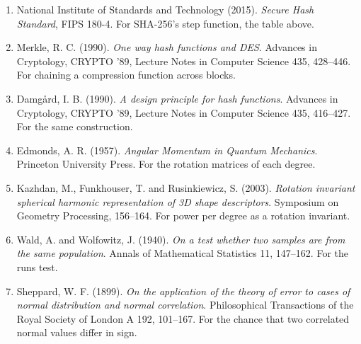\begin{enumerate}
  \item National Institute of Standards and Technology (2015). \emph{Secure Hash Standard}, FIPS 180-4. For SHA-256's step function, the table above.
  \item Merkle, R. C. (1990). \emph{One way hash functions and DES}. Advances in Cryptology, CRYPTO '89, Lecture Notes in Computer Science 435, 428--446. For chaining a compression function across blocks.
  \item Damg\aa{}rd, I. B. (1990). \emph{A design principle for hash functions}. Advances in Cryptology, CRYPTO '89, Lecture Notes in Computer Science 435, 416--427. For the same construction.
  \item Edmonds, A. R. (1957). \emph{Angular Momentum in Quantum Mechanics}. Princeton University Press. For the rotation matrices of each degree.
  \item Kazhdan, M., Funkhouser, T. and Rusinkiewicz, S. (2003). \emph{Rotation invariant spherical harmonic representation of 3D shape descriptors}. Symposium on Geometry Processing, 156--164. For power per degree as a rotation invariant.
  \item Wald, A. and Wolfowitz, J. (1940). \emph{On a test whether two samples are from the same population}. Annals of Mathematical Statistics 11, 147--162. For the runs test.
  \item Sheppard, W. F. (1899). \emph{On the application of the theory of error to cases of normal distribution and normal correlation}. Philosophical Transactions of the Royal Society of London A 192, 101--167. For the chance that two correlated normal values differ in sign.
\end{enumerate}
